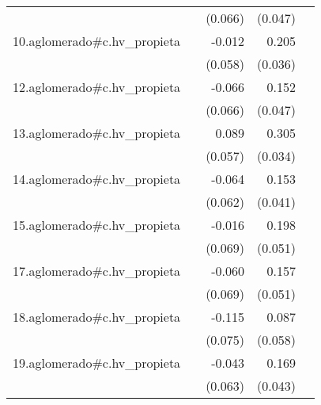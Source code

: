 {\begin{longtable}{l*{4}{D{.}{.}{-1}}}
            &                     &     (0.066)         &     (0.047)         &                     \\
\addlinespace
10.aglomerado#c.hv\_propieta&                     &      -0.012         &       0.205\sym{***}&                     \\
            &                     &     (0.058)         &     (0.036)         &                     \\
\addlinespace
12.aglomerado#c.hv\_propieta&                     &      -0.066         &       0.152\sym{**} &                     \\
            &                     &     (0.066)         &     (0.047)         &                     \\
\addlinespace
13.aglomerado#c.hv\_propieta&                     &       0.089         &       0.305\sym{***}&                     \\
            &                     &     (0.057)         &     (0.034)         &                     \\
\addlinespace
14.aglomerado#c.hv\_propieta&                     &      -0.064         &       0.153\sym{***}&                     \\
            &                     &     (0.062)         &     (0.041)         &                     \\
\addlinespace
15.aglomerado#c.hv\_propieta&                     &      -0.016         &       0.198\sym{***}&                     \\
            &                     &     (0.069)         &     (0.051)         &                     \\
\addlinespace
17.aglomerado#c.hv\_propieta&                     &      -0.060         &       0.157\sym{**} &                     \\
            &                     &     (0.069)         &     (0.051)         &                     \\
\addlinespace
18.aglomerado#c.hv\_propieta&                     &      -0.115         &       0.087         &                     \\
            &                     &     (0.075)         &     (0.058)         &                     \\
\addlinespace
19.aglomerado#c.hv\_propieta&                     &      -0.043         &       0.169\sym{***}&                     \\
            &                     &     (0.063)         &     (0.043)         &                     \\

\end{longtable}}
